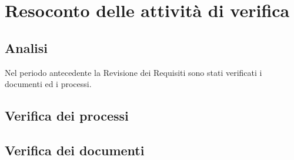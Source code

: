 \chapter{Resoconto delle attività di verifica}
\section{Analisi}
Nel periodo antecedente la Revisione dei Requisiti sono stati verificati i documenti ed i processi.


\section{Verifica dei processi}

\section{Verifica dei documenti}

